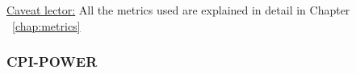 \documentclass{Configuration_Files/PoliMi3i_thesis}
\begin{document}
\vspace{3em}

\underline{Caveat lector:} All the metrics used are explained in detail in Chapter ~\ref{chap:metrics}

\newpage
\subsubsection{CPI-POWER}
\end{document}
